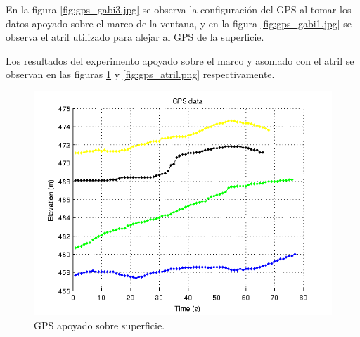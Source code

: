 \documentclass[spanish,12pt,a4paper,titlepage]{report}
\begin{document}
En la figura \ref{fig:gps_gabi3.jpg} se observa la configuración del GPS al tomar los datos apoyado sobre el marco de la ventana, y en la figura \ref{fig:gps_gabi1.jpg} se observa el atril utilizado para alejar al GPS de la superficie.

\begin{figure}[h!]
  \begin{center}
\hspace{50pt}
  \end{center}
\end{figure}

Los resultados del experimento apoyado sobre el marco y asomado con el atril se observan en las figuras \ref{fig:gps_ventana.png} y \ref{fig:gps_atril.png} respectivamente.

\begin{figure}[h!]
  \begin{center}
  \includegraphics[width=.75\textwidth]{./img/gps_ventana.png}
  \caption{GPS apoyado sobre superficie.}
  \label{fig:gps_ventana.png}
\end{center}
\end{figure}
\end{document}

